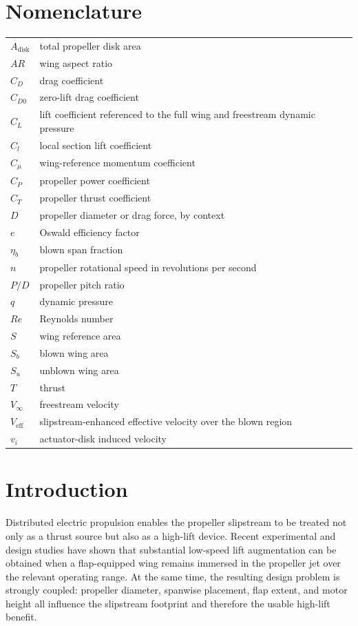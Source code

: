 \documentclass[conf]{new-aiaa}
\begin{document}
\section*{Nomenclature}
\begin{longtable*}{@{}ll@{}}
\(A_{\mathrm{disk}}\) & total propeller disk area \\
\(AR\) & wing aspect ratio \\
\(C_D\) & drag coefficient \\
\(C_{D0}\) & zero-lift drag coefficient \\
\(C_L\) & lift coefficient referenced to the full wing and freestream dynamic pressure \\
\(C_l\) & local section lift coefficient \\
\(C_\mu\) & wing-reference momentum coefficient \\
\(C_P\) & propeller power coefficient \\
\(C_T\) & propeller thrust coefficient \\
\(D\) & propeller diameter or drag force, by context \\
\(e\) & Oswald efficiency factor \\
\(\eta_b\) & blown span fraction \\
\(n\) & propeller rotational speed in revolutions per second \\
\(P/D\) & propeller pitch ratio \\
\(q\) & dynamic pressure \\
\(Re\) & Reynolds number \\
\(S\) & wing reference area \\
\(S_b\) & blown wing area \\
\(S_u\) & unblown wing area \\
\(T\) & thrust \\
\(V_\infty\) & freestream velocity \\
\(V_{\mathrm{eff}}\) & slipstream-enhanced effective velocity over the blown region \\
\(v_i\) & actuator-disk induced velocity \\
\end{longtable*}

\section{Introduction}

Distributed electric propulsion enables the propeller slipstream to be treated not only as a thrust source but also as a high-lift device. Recent experimental and design studies have shown that substantial low-speed lift augmentation can be obtained when a flap-equipped wing remains immersed in the propeller jet over the relevant operating range.\cite{Agrawal2019,Hawkswell2022} At the same time, the resulting design problem is strongly coupled: propeller diameter, spanwise placement, flap extent, and motor height all influence the slipstream footprint and therefore the usable high-lift benefit.
\end{document}
